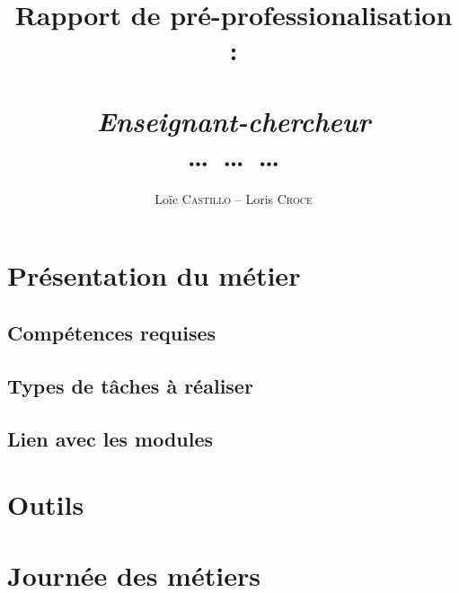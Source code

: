 \documentclass[a4paper]{report}
\author{Loïc \textsc{Castillo} -- Loris \textsc{Croce}}
\title{\Huge\textbf{Rapport de pré-professionalisation : }\\ \\ \emph{Enseignant-chercheur} \\ \dots\ \dots\ \dots}
\begin{document}
\maketitle{}

\tableofcontents

\chapter{Présentation du métier}
\section{Compétences requises}
\section{Types de tâches à réaliser}
\section{Lien avec les modules}
\chapter{Outils}
\chapter{Journée des métiers}
\end{document}
